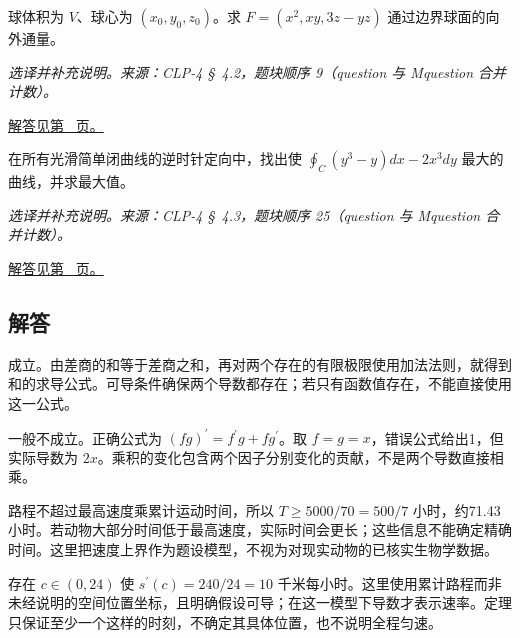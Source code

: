 \documentclass[UTF8,12pt,a4paper,fontset=fandol]{ctexart}
\begin{document}
\begin{example}[平移球的线性散度积分]\label{ex:c45q24}
球体积为 $V$、球心为 $(x_0,y_0,z_0)$。求 $F=(x^2,xy,3z-yz)$ 通过边界球面的向外通量。
\par\textit{选译并补充说明。来源：CLP-4 \S~4.2，题块顺序 9（question 与 Mquestion 合并计数）。}\par\hyperref[ans:c45q24]{解答见第~\pageref{ans:c45q24} 页。}
\end{example}
\begin{example}[选择使环流最大的曲线]\label{ex:c45q25}
在所有光滑简单闭曲线的逆时针定向中，找出使 $\oint_C(y^3-y)dx-2x^3dy$ 最大的曲线，并求最大值。
\par\textit{选译并补充说明。来源：CLP-4 \S~4.3，题块顺序 25（question 与 Mquestion 合并计数）。}\par\hyperref[ans:c45q25]{解答见第~\pageref{ans:c45q25} 页。}
\end{example}
\subsection{解答}
\begin{solve}\label{ans:c45q1}
成立。由差商的和等于差商之和，再对两个存在的有限极限使用加法法则，就得到和的求导公式。可导条件确保两个导数都存在；若只有函数值存在，不能直接使用这一公式。
\end{solve}

\begin{solve}\label{ans:c45q2}
一般不成立。正确公式为 $(fg)^{\prime}=f^{\prime}g+fg^{\prime}$。取 $f=g=x$，错误公式给出1，但实际导数为 $2x$。乘积的变化包含两个因子分别变化的贡献，不是两个导数直接相乘。
\end{solve}

\begin{solve}\label{ans:c45q3}
路程不超过最高速度乘累计运动时间，所以 $T\ge5000/70=500/7$ 小时，约71.43小时。若动物大部分时间低于最高速度，实际时间会更长；这些信息不能确定精确时间。这里把速度上界作为题设模型，不视为对现实动物的已核实生物学数据。
\end{solve}

\begin{solve}\label{ans:c45q4}
存在 $c\in(0,24)$ 使 $s^{\prime}(c)=240/24=10$ 千米每小时。这里使用累计路程而非未经说明的空间位置坐标，且明确假设可导；在这一模型下导数才表示速率。定理只保证至少一个这样的时刻，不确定其具体位置，也不说明全程匀速。
\end{solve}
\end{document}
